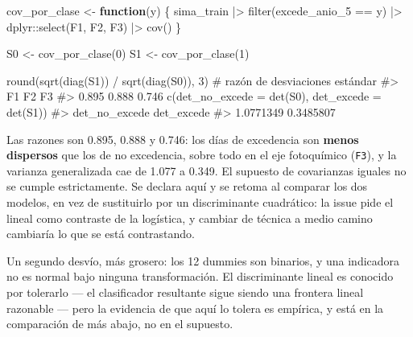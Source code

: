 \documentclass[
  spanish,
  letterpaper,
  DIV=11,
  numbers=noendperiod]{scrartcl}
\newenvironment{Shaded}{\begin{snugshade}}{\end{snugshade}}
\newcommand{\AttributeTok}[1]{\textcolor[rgb]{0.40,0.45,0.13}{#1}}
\newcommand{\CommentTok}[1]{\textcolor[rgb]{0.37,0.37,0.37}{#1}}
\newcommand{\ControlFlowTok}[1]{\textcolor[rgb]{0.00,0.23,0.31}{\textbf{#1}}}
\newcommand{\DecValTok}[1]{\textcolor[rgb]{0.68,0.00,0.00}{#1}}
\newcommand{\FunctionTok}[1]{\textcolor[rgb]{0.28,0.35,0.67}{#1}}
\newcommand{\NormalTok}[1]{\textcolor[rgb]{0.00,0.23,0.31}{#1}}
\newcommand{\OtherTok}[1]{\textcolor[rgb]{0.00,0.23,0.31}{#1}}
\newcommand{\SpecialCharTok}[1]{\textcolor[rgb]{0.37,0.37,0.37}{#1}}
\begin{document}
\begin{Shaded}
\begin{Highlighting}[]
\NormalTok{cov\_por\_clase }\OtherTok{\textless{}{-}} \ControlFlowTok{function}\NormalTok{(y) \{}
\NormalTok{    sima\_train }\SpecialCharTok{|\textgreater{}}
        \FunctionTok{filter}\NormalTok{(excede\_anio\_5 }\SpecialCharTok{==}\NormalTok{ y) }\SpecialCharTok{|\textgreater{}}
\NormalTok{        dplyr}\SpecialCharTok{::}\FunctionTok{select}\NormalTok{(F1, F2, F3) }\SpecialCharTok{|\textgreater{}}
        \FunctionTok{cov}\NormalTok{()}
\NormalTok{\}}

\NormalTok{S0 }\OtherTok{\textless{}{-}} \FunctionTok{cov\_por\_clase}\NormalTok{(}\DecValTok{0}\NormalTok{)}
\NormalTok{S1 }\OtherTok{\textless{}{-}} \FunctionTok{cov\_por\_clase}\NormalTok{(}\DecValTok{1}\NormalTok{)}

\FunctionTok{round}\NormalTok{(}\FunctionTok{sqrt}\NormalTok{(}\FunctionTok{diag}\NormalTok{(S1)) }\SpecialCharTok{/} \FunctionTok{sqrt}\NormalTok{(}\FunctionTok{diag}\NormalTok{(S0)), }\DecValTok{3}\NormalTok{) }\CommentTok{\# razón de desviaciones estándar}
\CommentTok{\#\textgreater{}    F1    F2    F3 }
\CommentTok{\#\textgreater{} 0.895 0.888 0.746}
\FunctionTok{c}\NormalTok{(}\AttributeTok{det\_no\_excede =} \FunctionTok{det}\NormalTok{(S0), }\AttributeTok{det\_excede =} \FunctionTok{det}\NormalTok{(S1))}
\CommentTok{\#\textgreater{} det\_no\_excede    det\_excede }
\CommentTok{\#\textgreater{}     1.0771349     0.3485807}
\end{Highlighting}
\end{Shaded}

Las razones son 0.895, 0.888 y 0.746: los días de excedencia son
\textbf{menos dispersos} que los de no excedencia, sobre todo en el eje
fotoquímico (\texttt{F3}), y la varianza generalizada cae de 1.077 a
0.349. El supuesto de covarianzas iguales no se cumple estrictamente. Se
declara aquí y se retoma al comparar los dos modelos, en vez de
sustituirlo por un discriminante cuadrático: la issue pide el lineal
como contraste de la logística, y cambiar de técnica a medio camino
cambiaría lo que se está contrastando.

Un segundo desvío, más grosero: los 12 dummies son binarios, y una
indicadora no es normal bajo ninguna transformación. El discriminante
lineal es conocido por tolerarlo --- el clasificador resultante sigue
siendo una frontera lineal razonable --- pero la evidencia de que aquí
lo tolera es empírica, y está en la comparación de más abajo, no en el
supuesto.
\end{document}
